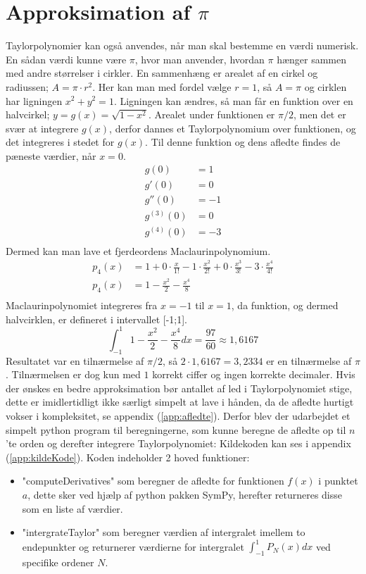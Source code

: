 \section{Approksimation af $\pi$}
Taylorpolynomier kan også anvendes, når man skal bestemme en værdi numerisk. En sådan værdi kunne være $\pi$, hvor man anvender, hvordan $\pi$ hænger sammen med andre størrelser i cirkler. En sammenhæng er arealet af en cirkel og radiussen; $A=\pi \cdot r^2$. Her kan man med fordel vælge $r=1$, så $A=\pi$ og cirklen har ligningen $x^2+y^2=1$. Ligningen kan ændres, så man får en funktion over en halvcirkel; $y=g(x)=\sqrt{1-x^2}$. Arealet under funktionen er $\pi/2$, men det er svær at integrere $g(x)$, derfor dannes et Taylorpolynomium over funktionen, og det integreres i stedet for $g(x)$. Til denne funktion og dens afledte findes de pæneste værdier, når $x=0$.
\begin{align*}
g(0) &= 1 \\
g'(0) &= 0 \\
g''(0) &= -1 \\
g^{(3)}(0) &= 0 \\
g^{(4)}(0) &= -3 \\
\end{align*}
Dermed kan man lave et fjerdeordens Maclaurinpolynomium.
\begin{align*}
p_{4} (x) &= 1 + 0\cdot \frac{x}{1!} - 1\cdot \frac{x^2}{2!} + 0\cdot \frac{x^3}{3!} - 3\cdot \frac{x^4}{4!}
\\
p_{4} (x) &= 1-\frac{x^2}{2}-\frac{x^4}{8} \\
\end{align*}
Maclaurinpolynomiet integreres fra $x=-1$ til $x=1$, da funktion, og dermed halvcirklen, er defineret i intervallet [-1;1].
\[
\int_{-1}^{1} 1-\frac{x^2}{2}-\frac{x^4}{8} dx = \frac{97}{60} \approx 1,6167
\]
Resultatet var en tilnærmelse af $\pi/2$, så $2\cdot 1,6167 = 3,2334$ er en tilnærmelse af $\pi$. Tilnærmelsen er dog kun med $1$ korrekt ciffer og ingen korrekte decimaler. 
Hvis der ønskes en bedre approksimation bør antallet af led i Taylorpolynomiet stige, dette er 
imidlertidligt ikke særligt simpelt at lave i hånden, da de afledte hurtigt vokser i kompleksitet, 
se appendix (\ref{app:afledte}).  %
Derfor blev der udarbejdet et simpelt python program til beregningerne, 
som kunne beregne de afledte op til $n$'te orden og derefter integrere Taylorpolynomiet:
Kildekoden kan ses i appendix (\ref{app:kildeKode}). 
Koden indeholder 2 hoved funktioner:
\begin{itemize}
  \item "computeDerivatives" som beregner de afledte for funktionen $f(x)$ 
  i punktet $a$, dette sker ved hjælp af python pakken SymPy, herefter returneres disse som en liste af værdier.  
  \item "intergrateTaylor" som beregner værdien af intergralet imellem to endepunkter
  og returnerer værdierne for intergralet $\int_{-1}^1 P_N (x) dx$ ved specifike ordener $N$. 
\end{itemize}
